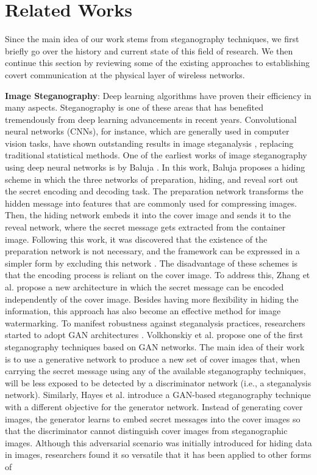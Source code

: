 \section{Related Works}
\label{s:related}
Since the main idea of our work stems from steganography techniques, we first briefly go over the history and current state of this field of research. We then continue this section by reviewing some of the existing approaches to establishing covert communication at the physical layer of wireless networks.

\textbf{Image Steganography}: Deep learning algorithms have proven their efficiency in many aspects. Steganography is one of these areas that has benefited tremendously from deep learning advancements in recent years. Convolutional neural networks (CNNs), for instance, which are generally used in computer vision tasks, have shown outstanding results in image steganalysis \cite{tan2014stacked,qian2015deep,xu2016structural}, replacing traditional statistical methods. One of the earliest works of image steganography using deep neural networks is by Baluja \cite{baluja2017hiding}. In this work, Baluja proposes a hiding scheme in which the three networks of preparation, hiding, and reveal sort out the secret encoding and decoding task. The preparation network transforms the hidden message into features that are commonly used for compressing images. Then, the hiding network embeds it into the cover image and sends it to the reveal network, where the secret message gets extracted from the container image. Following this work, it was discovered that the existence of the preparation network is not necessary, and the framework can be expressed in a simpler form by excluding this network \cite{zhang2021brief}. The disadvantage of these schemes is that the encoding process is reliant on the cover image. To address this, Zhang et al. \cite{zhang2020udh} propose a new architecture in which the secret message can be encoded independently of the cover image. Besides having more flexibility in hiding the information, this approach has also become an effective method for image watermarking. To manifest robustness against steganalysis practices, researchers started to adopt GAN architectures \cite{goodfellow2014generative}. Volkhonskiy et al. \cite{volkhonskiy2020steganographic} propose one of the first steganography techniques based on GAN networks. The main idea of their work is to use a generative network to produce a new set of cover images that, when carrying the secret message using any of the available steganography techniques, will be less exposed to be detected by a discriminator network (i.e., a steganalysis network). Similarly, Hayes et al. \cite{hayes2017generating} introduce a GAN-based steganography technique with a different objective for the generator network. Instead of generating cover images, the generator learns to embed secret messages into the cover images so that the discriminator cannot distinguish cover images from steganographic images. Although this adversarial scenario was initially introduced for hiding data in images, researchers found it so versatile that it has been applied to other forms of 
